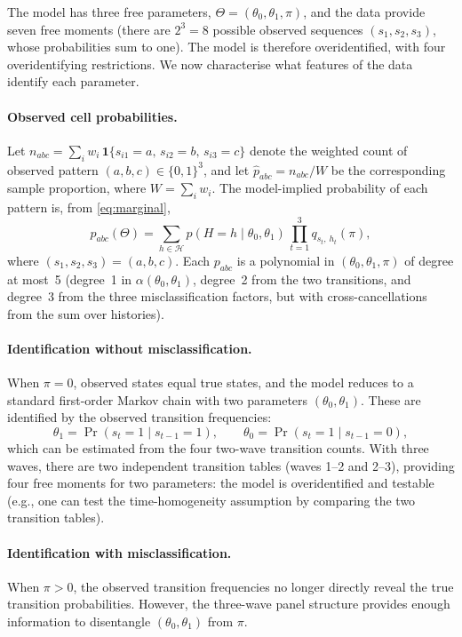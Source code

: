 The model has three free parameters,
\(\Theta = (\theta_0, \theta_1, \pi)\), and the data provide seven
free moments (there are \(2^3 = 8\) possible observed sequences
\((s_1, s_2, s_3)\), whose probabilities sum to one). The model is
therefore overidentified, with four overidentifying restrictions.
We now characterise what features of the data identify each parameter.

\paragraph{Observed cell probabilities.}
Let \(n_{abc} = \sum_{i} w_i\, \mathbf{1}\{s_{i1} = a,\, s_{i2} = b,\,
s_{i3} = c\}\) denote the weighted count of observed pattern
\((a, b, c) \in \{0,1\}^3\), and let
\(\hat{p}_{abc} = n_{abc} / W\) be the corresponding sample proportion,
where \(W = \sum_i w_i\). The model-implied probability of each pattern
is, from \eqref{eq:marginal},
\begin{equation}
p_{abc}(\Theta) = \sum_{h \in \mathcal{H}}
  p(H = h \mid \theta_0, \theta_1)\,
  \prod_{t=1}^{3} q_{s_t,\, h_t}(\pi),
\label{eq:cell_prob}
\end{equation}
where \((s_1, s_2, s_3) = (a, b, c)\). Each \(p_{abc}\) is a polynomial
in \((\theta_0, \theta_1, \pi)\) of degree at most~5 (degree~1 in
\(\alpha(\theta_0, \theta_1)\), degree~2 from the two transitions, and
degree~3 from the three misclassification factors, but with
cross-cancellations from the sum over histories).

\paragraph{Identification without misclassification.}
When \(\pi = 0\), observed states equal true states, and the model
reduces to a standard first-order Markov chain with two parameters
\((\theta_0, \theta_1)\). These are identified by the observed
transition frequencies:
\[
\theta_1 = \Pr(s_t = 1 \mid s_{t-1} = 1), \qquad
\theta_0 = \Pr(s_t = 1 \mid s_{t-1} = 0),
\]
which can be estimated from the four two-wave transition counts. With
three waves, there are two independent transition tables (waves 1--2 and
2--3), providing four free moments for two parameters: the model is
overidentified and testable (e.g., one can test the time-homogeneity
assumption by comparing the two transition tables).

\paragraph{Identification with misclassification.}
When \(\pi > 0\), the observed transition frequencies no longer directly
reveal the true transition probabilities. However, the three-wave panel
structure provides enough information to disentangle
\((\theta_0, \theta_1)\) from \(\pi\).

